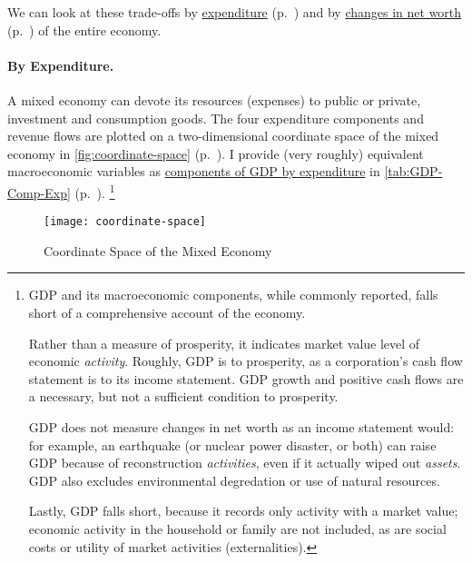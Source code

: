We can look at these trade-offs by \hyperref[sec:by-expenditure]{expenditure} (p.~\pageref{sec:by-expenditure}) and by \hyperref[sec:delta-net-worth]{changes in net worth} (p.~\pageref{sec:delta-net-worth}) of the entire economy.

\paragraph[By Expenditure]{By Expenditure.}
	\label{sec:by-expenditure}
A mixed economy can devote its resources (expenses) to public or private, investment and consumption goods.
The four expenditure components and revenue flows are plotted on a two-dimensional coordinate space of the mixed economy in \autoref{fig:coordinate-space} (p.~\pageref{fig:coordinate-space}).
I provide (very roughly) equivalent macroeconomic variables as \hyperref[tab:GDP-Comp-Exp]{components of GDP by expenditure} in \autoref{tab:GDP-Comp-Exp} (p.~\pageref{tab:GDP-Comp-Exp}).
\footnote{
	\gls{GDP} and its macroeconomic components, while commonly reported, falls short of a comprehensive account of the economy.

	Rather than a measure of prosperity, it indicates market value level of economic \emph{activity}.
	Roughly, \gls{GDP} is to prosperity, as a corporation's cash flow statement is to its income statement.
	\gls{GDP} growth and positive cash flows are a necessary, but not a sufficient condition to prosperity.

	\gls{GDP} does not measure changes in net worth as an income statement would:
	for example, an earthquake (or nuclear power disaster, or both) can raise \gls{GDP} because of reconstruction \emph{activities}, even if it actually wiped out \emph{assets}.
	\gls{GDP} also excludes environmental degredation or use of natural resources.

	Lastly, \gls{GDP} falls short, because it records only activity with a market value;
	economic activity in the household or family are not included, as are social costs or utility of market activities (externalities).
}

\begin{landscape}
 \begin{figure}[htbp]
	\centering
	\texttt{[image: coordinate-space]}
	\caption{Coordinate Space of the Mixed Economy}
	\label{fig:coordinate-space}
\end{figure} %
\end{landscape}

